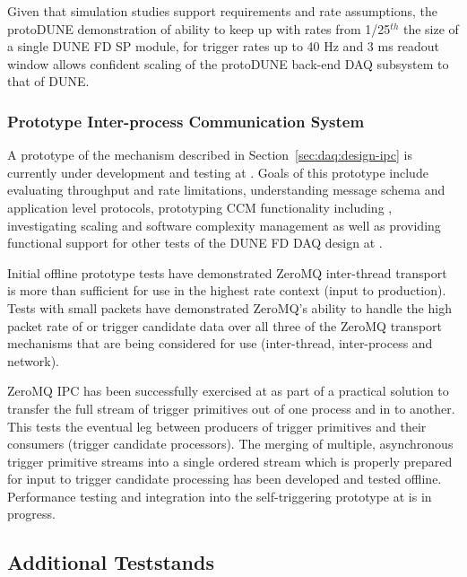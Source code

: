 Given that simulation studies support requirements and rate assumptions,
the protoDUNE demonstration of ability to keep up with rates from
1/25$^{th}$ the size of a single DUNE FD SP module, for trigger rates up
to 40 Hz and 3 ms readout window allows confident scaling of the
protoDUNE back-end DAQ subsystem to that of DUNE.

\subsubsection{Prototype Inter-process Communication System}

A prototype of the  mechanism described in
Section~\ref{sec:daq:design-ipc} is currently under development and testing at
. 
Goals of this prototype include evaluating throughput and rate limitations,
understanding message schema and application level protocols, prototyping CCM
functionality including , investigating scaling and software
complexity management as well as providing functional support for other tests of
the DUNE FD DAQ design at .

Initial offline prototype tests have demonstrated ZeroMQ inter-thread transport
is more than sufficient for use in the highest rate  context (input
to  production).
Tests with small packets have demonstrated ZeroMQ's ability to handle the high
packet rate of  or trigger candidate data over all three of
the ZeroMQ transport mechanisms that are being considered for use (inter-thread,
inter-process and network).  

ZeroMQ IPC has been successfully exercised at  as part of a
practical solution to transfer the full stream of trigger primitives out of one
process and in to another. 
This tests the eventual leg between producers of trigger primitives and their
consumers (trigger candidate processors). 
The merging of multiple, asynchronous trigger primitive streams into a single
ordered stream which is properly prepared for input to trigger candidate
processing has been developed and tested offline. 
Performance testing and integration into the self-triggering prototype at
 is in progress.


\subsection{Additional Teststands}
\label{sec:daq:validation-demonstrators}

